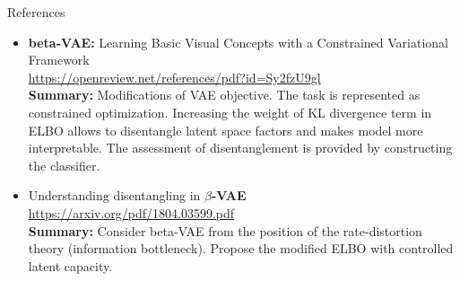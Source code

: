\documentclass{beamer}
\begin{document}
\begin{frame}{References}
{\tiny
\begin{itemize}
    
    \item \textbf{beta-VAE:} Learning Basic Visual Concepts with a Constrained Variational Framework \\
    \href{https://openreview.net/references/pdf?id=Sy2fzU9gl}{https://openreview.net/references/pdf?id=Sy2fzU9gl} \\
    \textbf{Summary:} Modifications of VAE objective. The task is represented as constrained optimization. Increasing the weight of KL divergence term in ELBO allows to disentangle latent space factors and makes model more interpretable. The assessment of disentanglement is provided by constructing the classifier.
    
    \item Understanding disentangling in \textbf{$\beta$-VAE} \\
    \href{https://arxiv.org/pdf/1804.03599.pdf}{https://arxiv.org/pdf/1804.03599.pdf} \\
    \textbf{Summary:} Consider beta-VAE from the position of the rate-distortion theory (information bottleneck). Propose the modified ELBO with controlled latent capacity.
\end{itemize}
}
\end{frame}
\end{document}
